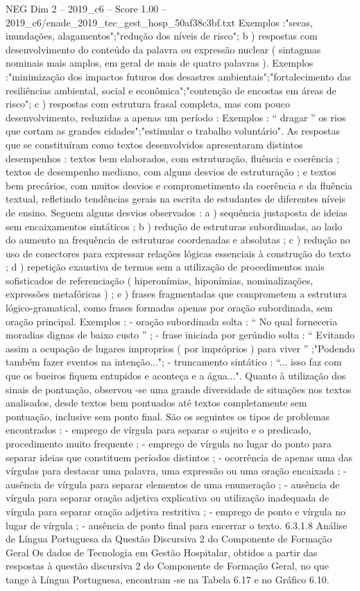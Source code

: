 \begin{textsample}{NEG Dim 2 – 2019\_c6 – Score 1.00 – 2019\_c6/enade\_2019\_tec\_gest\_hosp\_50af38c3bf.txt}
Exemplos :"secas, inundações, alagamentos";"redução dos níveis de risco"; b ) respostas com desenvolvimento do conteúdo da palavra ou expressão nuclear ( sintagmas nominais mais amplos, em geral de mais de quatro palavras ).
Exemplos :"minimização dos impactos futuros dos desastres ambientais";"fortalecimento das resiliências ambiental, social e econômica";"contenção de encostas em áreas de risco"; c ) respostas com estrutura frasal completa, mas com pouco desenvolvimento, reduzidas a apenas um período : Exemplos : “ dragar ” os rios que cortam as grandes cidades";"estimular o trabalho voluntário".
As respostas que se constituíram como textos desenvolvidos apresentaram distintos desempenhos : textos bem elaborados, com estruturação, fluência e coerência ; textos de desempenho mediano, com alguns desvios de estruturação ; e textos bem precários, com muitos desvios e comprometimento da coerência e da fluência textual, refletindo tendências gerais na escrita de estudantes de diferentes níveis de ensino.
Seguem alguns desvios observados : a ) sequência justaposta de ideias sem encaixamentos sintáticos ; b ) redução de estruturas subordinadas, ao lado do aumento na frequência de estruturas coordenadas e absolutas ; c ) redução no uso de conectores para expressar relações lógicas essenciais à construção do texto ; d ) repetição exaustiva de termos sem a utilização de procedimentos mais sofisticados de referenciação ( hiperonímias, hiponímias, nominalizações, expressões metafóricas ) ; e ) frases fragmentadas que comprometem a estrutura lógico-gramatical, como frases formadas apenas por oração subordinada, sem oração principal.
Exemplos : - oração subordinada solta : “ No qual forneceria moradias dignas de baixo custo ” ; - frase iniciada por gerúndio solta : “ Evitando assim a ocupação de lugares improprios ( por impróprios ) para viver ” ;"Podendo também fazer eventos na intenção..."; - truncamento sintático : “... isso faz com que os bueiros fiquem entupidos e aconteça e a água...".
Quanto à utilização dos sinais de pontuação, observou -se uma grande diversidade de situações nos textos analisados, desde textos bem pontuados até textos completamente sem pontuação, inclusive sem ponto final.
São os seguintes os tipos de problemas encontrados : - emprego de vírgula para separar o sujeito e o predicado, procedimento muito frequente ; - emprego de vírgula no lugar do ponto para separar ideias que constituem períodos distintos ; - ocorrência de apenas uma das vírgulas para destacar uma palavra, uma expressão ou uma oração encaixada ; - ausência de vírgula para separar elementos de uma enumeração ; - ausência de vírgula para separar oração adjetiva explicativa ou utilização inadequada de vírgula para separar oração adjetiva restritiva ; - emprego de ponto e vírgula no lugar de vírgula ; - ausência de ponto final para encerrar o texto. 6.3.1.8 Análise de Língua Portuguesa da Questão Discursiva 2 do Componente de Formação Geral Os dados de Tecnologia em Gestão Hospitalar, obtidos a partir das respostas à questão discursiva 2 do Componente de Formação Geral, no que tange à Língua Portuguesa, encontram -se na Tabela 6.17 e no Gráfico 6.10.

\end{textsample}
